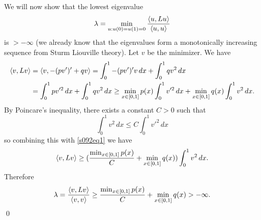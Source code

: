 We will now show that the lowest eigenvalue
$$\lambda = \min_{u: u(0) = u(1) = 0} \frac{\langle u, Lu \rangle}{\langle u, u \rangle}$$
is $> -\infty$ (we already know that the eigenvalues form a monotonically increasing sequence from Sturm Liouville theory).
Let $v$ be the minimizer. We have
\begin{equation}\label{s092eq1}
\begin{aligned}
\langle v, Lv \rangle &= \langle v, -(pv')' + qv \rangle = \int_{0}^{1}-(pv')'v\, dx + \int_{0}^{1}qv^{2}\, dx\\
&= \int_{0}^{1}pv'^{2}\, dx + \int_{0}^{1}qv^{2}\, dx \geq \min_{x \in [0, 1]}p(x)\int_{0}^{1}v'^{2}\, dx + \min_{x \in [0, 1]}q(x)\int_{0}^{1}v^{2}\, dx.
\end{aligned}
\end{equation}
By Poincare's inequality, there exists a constant $C > 0$ such that
$$\int_{0}^{1}v^{2}\, dx \leq C\int_{0}^{1}v'^{2}\, dx$$ so combining this with \eqref{s092eq1} we have
$$\langle v, Lv \rangle \geq (\frac{\min_{x \in [0, 1]}p(x)}{C} + \min_{x \in [0, 1]}q(x))\int_{0}^{1}v^{2}\, dx.$$
Therefore
$$\lambda = \frac{\langle v, Lv \rangle}{\langle v,v \rangle} \geq \frac{\min_{x \in [0, 1]}p(x)}{C} + \min_{x \in [0, 1]}q(x) > -\infty.$$
\hfill\qed

